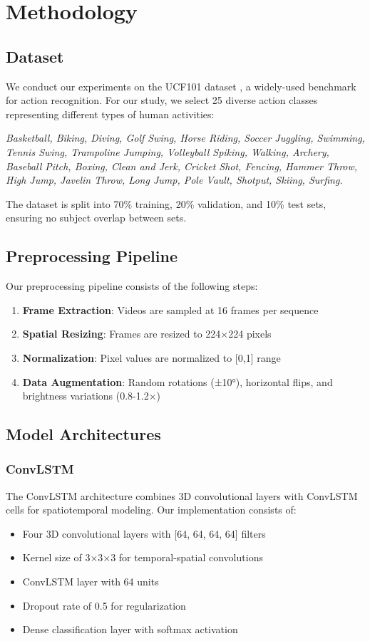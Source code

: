 \documentclass[twocolumn]{article}
\begin{document}
\section{Methodology}

\subsection{Dataset}
We conduct our experiments on the UCF101 dataset \cite{soomro2012ucf101}, a widely-used benchmark for action recognition. For our study, we select 25 diverse action classes representing different types of human activities:

\textit{Basketball, Biking, Diving, Golf Swing, Horse Riding, Soccer Juggling, Swimming, Tennis Swing, Trampoline Jumping, Volleyball Spiking, Walking, Archery, Baseball Pitch, Boxing, Clean and Jerk, Cricket Shot, Fencing, Hammer Throw, High Jump, Javelin Throw, Long Jump, Pole Vault, Shotput, Skiing, Surfing.}

The dataset is split into 70\% training, 20\% validation, and 10\% test sets, ensuring no subject overlap between sets.

\subsection{Preprocessing Pipeline}
Our preprocessing pipeline consists of the following steps:
\begin{enumerate}
    \item \textbf{Frame Extraction}: Videos are sampled at 16 frames per sequence
    \item \textbf{Spatial Resizing}: Frames are resized to 224×224 pixels
    \item \textbf{Normalization}: Pixel values are normalized to [0,1] range
    \item \textbf{Data Augmentation}: Random rotations (±10°), horizontal flips, and brightness variations (0.8-1.2×)
\end{enumerate}

\subsection{Model Architectures}

\subsubsection{ConvLSTM}
The ConvLSTM architecture combines 3D convolutional layers with ConvLSTM cells for spatiotemporal modeling. Our implementation consists of:
\begin{itemize}
    \item Four 3D convolutional layers with [64, 64, 64, 64] filters
    \item Kernel size of 3×3×3 for temporal-spatial convolutions
    \item ConvLSTM layer with 64 units
    \item Dropout rate of 0.5 for regularization
    \item Dense classification layer with softmax activation
\end{itemize}
\end{document}
